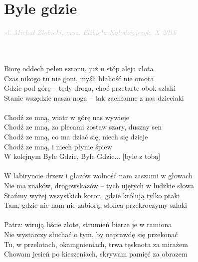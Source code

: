 \documentclass[a5paper, 10pt]{book}
\begin{document}
\section{Byle gdzie}\textcolor{lightgray}{\textit{sł. Michał Żłobicki, muz. Elżbieta Kołodziejczyk, X 2016}}\\~\\
\begin{minipage}[t]{0.8\textwidth}
~\\
Biorę oddech pełen szronu, już u stóp aleja złota		\\
Czas nikogo tu nie goni, myśli błahość nie omota		\\
Gdzie pod górę – tędy droga, choć przetarte obok szlaki\\
Stanie wszędzie nasza noga – tak zachłanne z nas dzieciaki\\
\\
\hspace*{5mm}Chodź ze mną, wiatr w górę nas wywieje			\\
\hspace*{5mm}Chodź ze mną, za plecami zostaw szary, duszny sen\\
\hspace*{5mm}Chodź ze mną, co ma dziać się, niech się dzieje		\\
\hspace*{5mm}Chodź ze mną, i niech płynie śpiew			\\
\hspace*{5mm}W kolejnym Byle Gdzie, Byle Gdzie... [byle z tobą]\\
\\
W labiryncie drzew i głazów wolność nam zaszumi w głowach\\
Nie ma znaków, drogowskazów – tych ujętych w ludzkie słowa\\
Stańmy wyżej wszystkich koron, gdzie królują tylko ptaki\\
Tam, gdzie nic nam nie zabiorą, słońca przekroczymy szlaki\\
\\
Patrz: wirują liście złote, strumień bierze je w ramiona\\
Nie wystarczy słuchać o tym, by naprawdę się przekonać\\
Tu, w przelotach, okamgnieniach, trwa tęsknota za mirażem\\
Chowam jesień po kieszeniach, skrywam pamięć za obrazem\\
\end{minipage}
\end{document}
